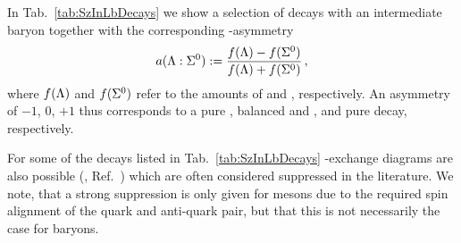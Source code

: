 In Tab.~\ref{tab:SzInLbDecays} we show a selection of \Lb decays with an intermediate \Lz baryon together with the corresponding \Lz-\Sz asymmetry
\begin{equation}
    \label{eq:theory_lzszasym}
    a({\Lambda} : {{\Sigma}^0}) := \frac{f({\Lambda}) - f({{\Sigma}^0})}{f({\Lambda}) + f({{\Sigma}^0})} \,,
\end{equation}
where $f({\Lambda})$ and $f({{\Sigma}^0})$ refer to the amounts of \Lz and \Sz, respectively.
An asymmetry of $-1$, $0$, $+1$ thus corresponds to a pure \Sz, balanced \Lz and \Sz, and pure \Lz decay, respectively.

For some of the decays listed in Tab.~\ref{tab:SzInLbDecays} \W-exchange diagrams are also possible (\eg{}, Ref.~\cite{wexchange}) which are often considered suppressed in the literature.
We note, that a strong suppression is only given for mesons due to the required spin alignment of the quark and anti-quark pair, but that this is not necessarily the case for baryons.

